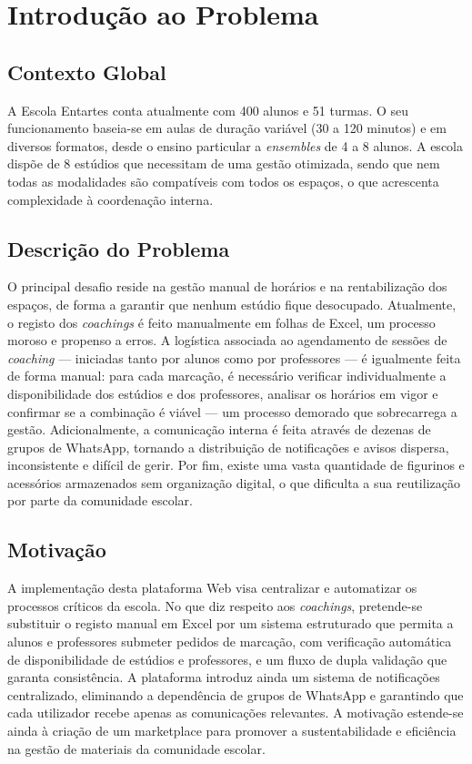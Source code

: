 \documentclass[12pt,a4paper]{report}
\begin{document}
\tableofcontents

\newpage

\listoffigures

\newpage

\chapter{Introdução ao Problema}

\section{Contexto Global}
A Escola Entartes conta atualmente com 400 alunos e 51 turmas. O seu funcionamento baseia-se em aulas de duração variável (30 a 120 minutos) e em diversos formatos, desde o ensino particular a \textit{ensembles} de 4 a 8 alunos. A escola dispõe de 8 estúdios que necessitam de uma gestão otimizada, sendo que nem todas as modalidades são compatíveis com todos os espaços, o que acrescenta complexidade à coordenação interna.

\section{Descrição do Problema}
O principal desafio reside na gestão manual de horários e na rentabilização dos espaços, de forma a garantir que nenhum estúdio fique desocupado. Atualmente, o registo dos \textit{coachings} é feito manualmente em folhas de Excel, um processo moroso e propenso a erros. A logística associada ao agendamento de sessões de \textit{coaching} --- iniciadas tanto por alunos como por professores --- é igualmente feita de forma manual: para cada marcação, é necessário verificar individualmente a disponibilidade dos estúdios e dos professores, analisar os horários em vigor e confirmar se a combinação é viável --- um processo demorado que sobrecarrega a gestão. Adicionalmente, a comunicação interna é feita através de dezenas de grupos de WhatsApp, tornando a distribuição de notificações e avisos dispersa, inconsistente e difícil de gerir. Por fim, existe uma vasta quantidade de figurinos e acessórios armazenados sem organização digital, o que dificulta a sua reutilização por parte da comunidade escolar.

\section{Motivação}
A implementação desta plataforma Web visa centralizar e automatizar os processos críticos da escola. No que diz respeito aos \textit{coachings}, pretende-se substituir o registo manual em Excel por um sistema estruturado que permita a alunos e professores submeter pedidos de marcação, com verificação automática de disponibilidade de estúdios e professores, e um fluxo de dupla validação que garanta consistência. A plataforma introduz ainda um sistema de notificações centralizado, eliminando a dependência de grupos de WhatsApp e garantindo que cada utilizador recebe apenas as comunicações relevantes. A motivação estende-se ainda à criação de um marketplace para promover a sustentabilidade e eficiência na gestão de materiais da comunidade escolar.
\end{document}
